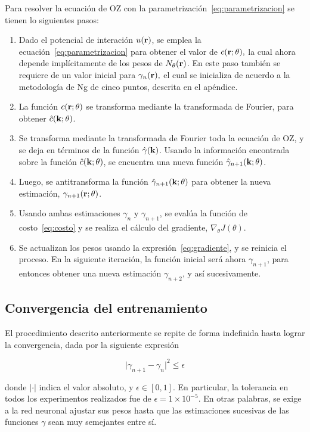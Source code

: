 Para resolver la ecuación de OZ con la parametrización~\eqref{eq:parametrizacion} se tienen lo siguientes pasos:

\begin{enumerate}
    \item Dado el potencial de interación $u(\mathbf{r})$, se emplea la ecuación~\eqref{eq:parametrizacion} para obtener el valor de $c(\mathbf{r}; \theta),$ la cual ahora depende implícitamente de los pesos de $N_{\theta}(\mathbf{r})$. En este paso también se requiere de un valor inicial para $\gamma_{n}(\mathbf{r}),$ el cual se inicializa de acuerdo a la metodología de Ng de cinco puntos, descrita en el apéndice. %
    \item La función $c(\mathbf{r}; \theta)$ se transforma mediante la transformada de Fourier, para obtener $\hat{c}(\mathbf{k}; \theta)$.
    \item Se transforma mediante la transformada de Fourier toda la ecuación de OZ, y se deja en términos de la función $\hat{\gamma}(\mathbf{k})$. Usando la información encontrada sobre la función $\hat{c}(\mathbf{k}; \theta)$, se encuentra una nueva función $\hat{\gamma}_{n+1}(\mathbf{k}; \theta)$.
    \item Luego, se antitransforma la función $\hat{\gamma}_{n+1}(\mathbf{k}; \theta)$ para obtener la nueva estimación, $\gamma_{n+1}(\mathbf{r}; \theta)$.
    \item Usando ambas estimaciones $\gamma_{n}$ y $\gamma_{n+1}$, se evalúa la función de costo~\eqref{eq:costo} y se realiza el cálculo del gradiente, $\nabla_{\theta} J(\theta)$.
    \item Se actualizan los pesos usando la expresión~\eqref{eq:gradiente}, y se reinicia el proceso. En la siguiente iteración, la función inicial será ahora $\gamma_{n+1}$, para entonces obtener una nueva estimación $\gamma_{n+2}$, y así sucesivamente.
\end{enumerate}

\subsection{Convergencia del entrenamiento}
El procedimiento descrito anteriormente se repite de forma indefinida hasta lograr la 
convergencia, dada por la siguiente expresión

\begin{equation}
    {\lvert \gamma_{n+1} - \gamma_{n} \rvert}^2 \leq \epsilon
    \label{eq:tolerancia}
\end{equation}

donde $\lvert \cdot \rvert$ indica el valor absoluto, y $\epsilon \in [0, 1]$.
En particular, la tolerancia en todos los experimentos realizados fue de
$\epsilon = 1 \times 10^{-5}$.
En otras palabras, se exige a la red neuronal ajustar sus pesos hasta que las estimaciones
sucesivas de las funciones $\gamma$ sean muy semejantes entre sí.

